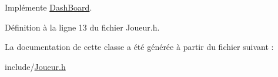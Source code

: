 Implémente \hyperlink{a00006_a4805c3218cfe5c48db4aa3a53795e51e}{DashBoard}.



Définition à la ligne 13 du fichier Joueur.h.



La documentation de cette classe a été générée à partir du fichier suivant :\begin{DoxyCompactItemize}
\item 
include/\hyperlink{a00029}{Joueur.h}\end{DoxyCompactItemize}
